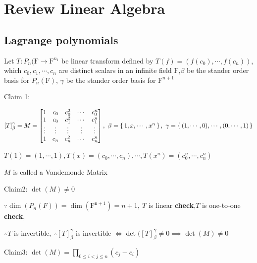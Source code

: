 \section{Review Linear Algebra}
\subsection{Lagrange polynomials}

Let $T:P_n(\mathrm{F}\rightarrow \mathrm{F}^{n_1}$ be linear transform defined by $T(f)=(f(c_0),\cdots,f(c_n))$, which $c_0,c_1,\cdots,c_n$ are distinct scalars in an infinite field $\mathrm{F}$,$\beta$ be the stander order basis for $P_n(\mathrm{F})$, $\gamma$ be the stander order basis for $\mathrm{F}^{n+1}$

Claim 1:

$[T]^{\gamma}_{\beta} = M = \left[\begin{matrix}
	1&c_0&c_0^2 &\cdots & c_0^n\\
	1&c_0&c_1^2 &\cdots & c_1^n\\
	\vdots&\vdots&\vdots&\vdots&\vdots\\
	1&c_n&c_n^2&\cdots&c_n^n
\end{matrix}\right],~ \beta = \left\{ \,1,x,\cdots,x^n \,\right\},~\gamma=\left\{ \,(1,\cdots,0),\cdots,(0,\cdots,1) \,\right\}$

$T(1) = (1,\cdots,1),T(x) = (c_0,\cdots,c_n),\cdots,T(x^n)=(c_0^n,\cdots,c_n^n)$

$M$ is called a Vandemonde Matrix

Claim2: $\det(M) \neq 0$

$\because \dim(P_n(F)) = \dim(\mathrm{F^{n+1}}) = n+1,~T$ is linear \textbf{\color{red}check},$T$ is one-to-one \textbf{\color{red}check},

$\therefore T$ is invertible, $\therefore [T]^{\gamma}_{\beta}$ is invertible $\Leftrightarrow \det([T]^{\gamma}_{\beta} \neq 0 \implies \det(M) \neq 0$

Claim3: $\det(M) = \prod_{0\leq i < j \leq n}(c_j - c_i)$

